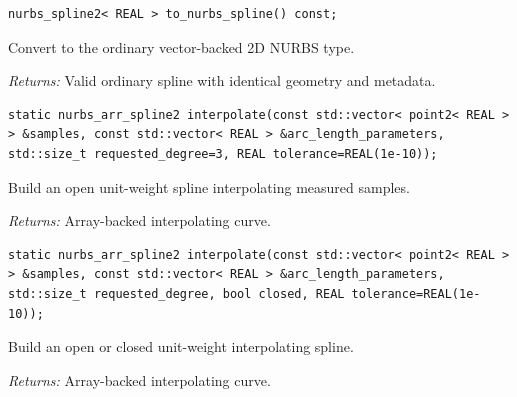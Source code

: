\par\noindent\begin{minipage}{\linewidth}
\begin{lstlisting}[style=apireference]
nurbs_spline2< REAL > to_nurbs_spline() const;
\end{lstlisting}
{\footnotesize Convert to the ordinary vector-backed 2D NURBS type.\par}
{\footnotesize\textit{Returns:} Valid ordinary spline with identical geometry and metadata.\par}
\end{minipage}\par\vspace{1pt}
\par\noindent\begin{minipage}{\linewidth}
\begin{lstlisting}[style=apireference]
static nurbs_arr_spline2 interpolate(const std::vector< point2< REAL > > &samples, const std::vector< REAL > &arc_length_parameters, std::size_t requested_degree=3, REAL tolerance=REAL(1e-10));
\end{lstlisting}
{\footnotesize Build an open unit-weight spline interpolating measured samples.\par}
{\footnotesize\textit{Returns:} Array-backed interpolating curve.\par}
\end{minipage}\par\vspace{1pt}
\par\noindent\begin{minipage}{\linewidth}
\begin{lstlisting}[style=apireference]
static nurbs_arr_spline2 interpolate(const std::vector< point2< REAL > > &samples, const std::vector< REAL > &arc_length_parameters, std::size_t requested_degree, bool closed, REAL tolerance=REAL(1e-10));
\end{lstlisting}
{\footnotesize Build an open or closed unit-weight interpolating spline.\par}
{\footnotesize\textit{Returns:} Array-backed interpolating curve.\par}
\end{minipage}\par\vspace{1pt}
